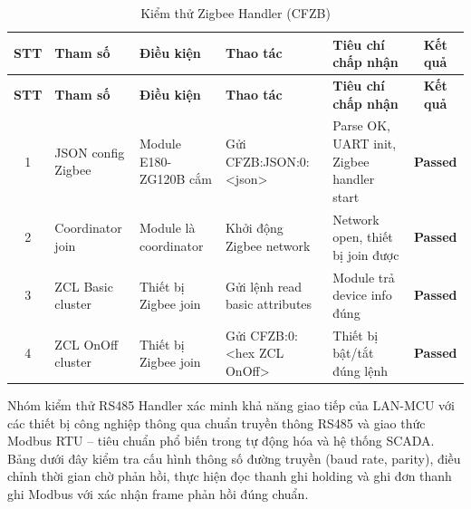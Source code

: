         \begin{longtable}{|c|p{2cm}|p{2.5cm}|p{3.5cm}|p{4cm}|c|}
            \caption{Kiểm thử Zigbee Handler (CFZB)}
            \label{tab:test_zigbee_handler} \\
            \hline
            \textbf{STT} & \textbf{Tham số} & \textbf{Điều kiện} & \textbf{Thao tác} & \textbf{Tiêu chí chấp nhận} & \textbf{Kết quả} \\ \hline
            \endfirsthead
            \hline
            \textbf{STT} & \textbf{Tham số} & \textbf{Điều kiện} & \textbf{Thao tác} & \textbf{Tiêu chí chấp nhận} & \textbf{Kết quả} \\ \hline
            \endhead
            \hline
            \endfoot
            \endlastfoot

            1 & JSON config Zigbee & Module E180-ZG120B cắm & Gửi CFZB:JSON:0:\newline<json> & Parse OK, UART init, Zigbee handler start & \textcolor{modern_blue}{\textbf{Passed}} \\ \hline
            2 & Coordinator join & Module là coordinator & Khởi động Zigbee network & Network open, thiết bị join được & \textcolor{modern_blue}{\textbf{Passed}} \\ \hline
            3 & ZCL Basic cluster & Thiết bị Zigbee join & Gửi lệnh read basic attributes & Module trả device info đúng & \textcolor{modern_blue}{\textbf{Passed}} \\ \hline
            4 & ZCL OnOff cluster & Thiết bị Zigbee join & Gửi CFZB:0:<hex ZCL OnOff> & Thiết bị bật/tắt đúng lệnh & \textcolor{modern_blue}{\textbf{Passed}} \\ \hline
        \end{longtable}

        Nhóm kiểm thử RS485 Handler xác minh khả năng giao tiếp của LAN-MCU với các thiết bị công nghiệp thông qua chuẩn truyền thông RS485 và giao thức Modbus RTU -- tiêu chuẩn phổ biến trong tự động hóa và hệ thống SCADA. Bảng dưới đây kiểm tra cấu hình thông số đường truyền (baud rate, parity), điều chỉnh thời gian chờ phản hồi, thực hiện đọc thanh ghi holding và ghi đơn thanh ghi Modbus với xác nhận frame phản hồi đúng chuẩn.

